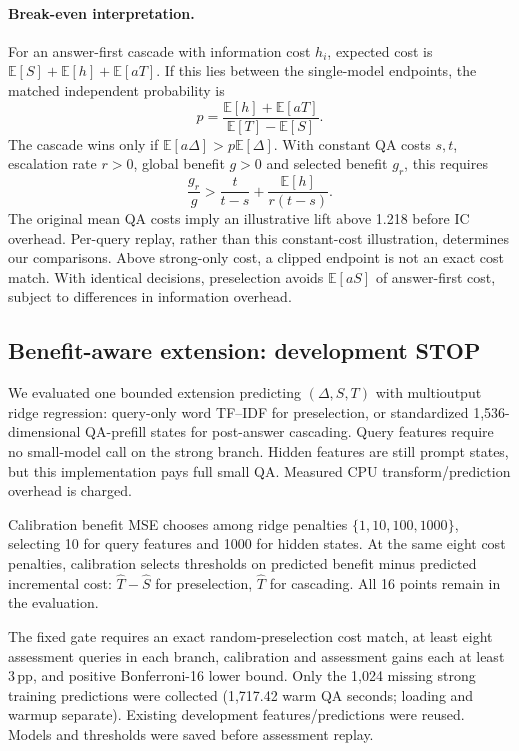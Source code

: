 \documentclass[11pt]{article}
\newcommand{\E}{\mathbb{E}}
\newcommand{\pp}{\,\text{pp}}
\begin{document}
\paragraph{Break-even interpretation.}
For an answer-first cascade with information cost $h_i$, expected cost is $\E[S]+\E[h]+\E[aT]$. If this lies between the single-model endpoints, the matched independent probability is
\begin{equation}
p=\frac{\E[h]+\E[aT]}{\E[T]-\E[S]}.
\end{equation}
The cascade wins only if $\E[a\Delta]>p\E[\Delta]$. With constant QA costs $s,t$, escalation rate $r>0$, global benefit $g>0$ and selected benefit $g_r$, this requires
\begin{equation}
\frac{g_r}{g}>\frac{t}{t-s}+\frac{\E[h]}{r(t-s)}.
\label{eq:breakeven}
\end{equation}
The original mean QA costs imply an illustrative lift above 1.218 before IC overhead. Per-query replay, rather than this constant-cost illustration, determines our comparisons. Above strong-only cost, a clipped endpoint is not an exact cost match. With identical decisions, preselection avoids $\E[aS]$ of answer-first cost, subject to differences in information overhead.

\subsection{Benefit-aware extension: development STOP}
\label{sec:benefit}
We evaluated one bounded extension predicting $(\Delta,S,T)$ with multioutput ridge regression: query-only word TF--IDF for preselection, or standardized 1,536-dimensional QA-prefill states for post-answer cascading. Query features require no small-model call on the strong branch. Hidden features are still prompt states, but this implementation pays full small QA. Measured CPU transform/prediction overhead is charged.

Calibration benefit MSE chooses among ridge penalties $\{1,10,100,1000\}$, selecting 10 for query features and 1000 for hidden states. At the same eight cost penalties, calibration selects thresholds on predicted benefit minus predicted incremental cost: $\widehat T-\widehat S$ for preselection, $\widehat T$ for cascading. All 16 points remain in the evaluation.

The fixed gate requires an exact random-preselection cost match, at least eight assessment queries in each branch, calibration and assessment gains each at least $3\pp$, and positive Bonferroni-16 lower bound. Only the 1,024 missing strong training predictions were collected (1,717.42 warm QA seconds; loading and warmup separate). Existing development features/predictions were reused. Models and thresholds were saved before assessment replay.
\end{document}
